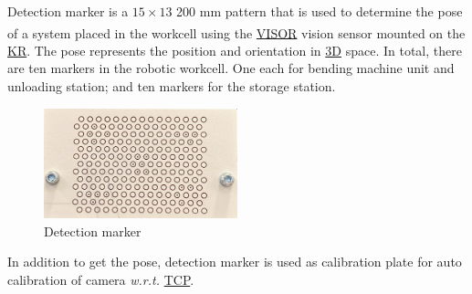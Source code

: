 Detection marker is a $15\times13$ 200 mm pattern that is used to determine the pose of a system placed in the workcell using the \hyperref[acro:VISOR]{VISOR}\textsuperscript{\textregistered} vision sensor
mounted on the \hyperref[acro:KR]{KR}. The pose represents the position and orientation in \hyperref[acro:3D]{3D} space. In total, there are ten markers in the robotic workcell.
One each for bending machine unit and unloading station; and ten markers for the storage station.

\begin{figure}[h]
    \centering
    \includegraphics[width=0.5\textwidth]{figures/detection-marker.png}
    \caption{Detection marker}
    \label{fig:marker}
\end{figure}

In addition to get the pose, detection marker is used as calibration plate for auto calibration of camera \textit{w.r.t.} \hyperref[acro:TCP]{TCP}.

